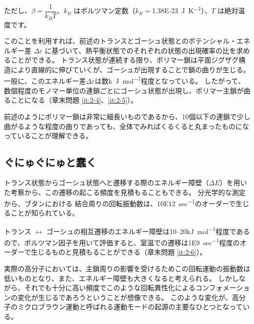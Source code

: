 \documentclass[a4paper,11pt]{jlreq}
\begin{document}
ただし、$\beta=\dfrac{1}{k_B T}$、$k_B$ はボルツマン定数（$k_B =$\qty{1.38E-23}{J K^{-1}}）、$T$ は絶対温度です。

このことを利用すれば、前述のトランスとゴーシュ状態とのポテンシャル・エネルギー差 $\Delta \varepsilon$ に基づいて、熱平衡状態でのそれぞれの状態の出現確率の比を求めることができる。
トランス状態が連続する限り、ポリマー鎖は平面ジグザグ構造により直線的に伸びていくが、ゴーシュが出現することで鎖の曲りが生じる。
一般に、このエネルギー差$\Delta \varepsilon$は数\unit{k J mol^{-1}}程度となっている。
したがって、数個程度のモノマー単位の連鎖ごとにゴーシュ状態が出現し、ポリマー主鎖が曲ることになる（章末問題 \ref{it:2-4}、\ref{it:2-5}）。

前述のようにポリマー鎖は非常に細長いものであるから、10個以下の連鎖で少し曲がるような程度の曲りであっても、全体でみればくるくると丸まったものになっていることが理解できる。

\subsection{ぐにゅぐにゅと蠢く}

トランス状態からゴーシュ状態へと遷移する際のエネルギー障壁（$\Delta E$）を用いた考察から、この遷移の起こる頻度を見積もることもできる。
分光学的な測定から、ブタンにおける 結合周りの回転振動数は、\qty{10E12}{sec^{-1}}のオーダーで生じることが知られている。

トランス $\leftrightarrow$ ゴーシュの相互遷移のエネルギー障壁は\numrange{10}{20}\unit{kJ mol^{-1}}程度であるので、ボルツマン因子を用いて評価すると、室温での遷移は\qty{1E9}{sec^{-1}}程度のオーダーで生じるものと見積もることができる（章末問題 \ref{it:2-6}）。

実際の高分子においては、主鎖周りの影響を受けるためこの回転運動の振動数は低いものとなり、また、エネルギー障壁も大きくなると考えられる。
しかしながら、それでも十分に高い頻度でこのような回転異性化によるコンフォメーションの変化が生じるであろうということが想像できる。
このような変化が、高分子のミクロブラウン運動と呼ばれる運動モードの起源の主要なひとつとなっている。
\end{document}
